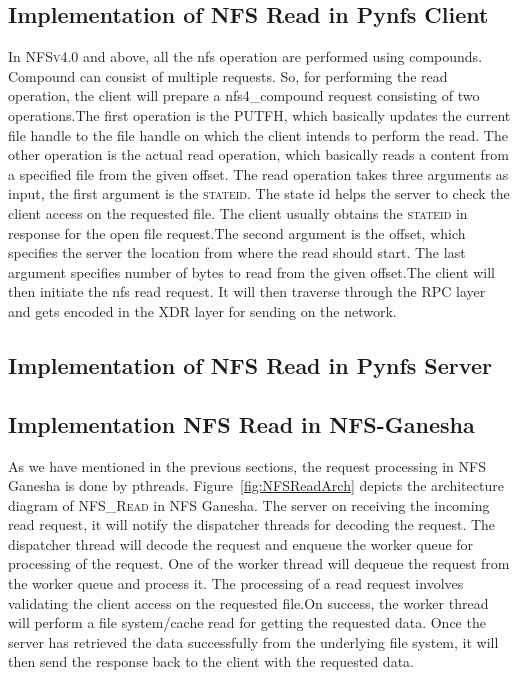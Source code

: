 \subsection{Implementation of NFS Read in Pynfs Client}
 
In \textsc{NFSv4.0} and above, all the nfs operation are performed using compounds. Compound can consist of multiple requests. So, for performing the read operation, the client will prepare a nfs4\_compound request consisting of two operations.The first operation is the \textsc{PUTFH}, which  basically updates the current file handle to the file handle on which the client intends to perform the read. The other operation is the actual read operation, which basically reads a content from a specified file from the given offset. The read operation takes three arguments as input, the first argument is the  \textsc{stateid}. The state id helps the server to check the client access on the requested file. The client usually obtains the \textsc{stateid} in response for the open file request.The second  argument is the offset, which specifies the server the location from where the read should start. The last argument specifies number of bytes to read from the given offset.The client will then initiate the nfs read request. It will then traverse through the RPC layer and gets encoded in the XDR layer for sending on the network.

\subsection{Implementation of NFS Read in Pynfs Server}


\subsection{Implementation NFS Read in NFS-Ganesha}

 As we have mentioned in the previous sections, the request processing in NFS Ganesha is done by pthreads. Figure~\ref{fig:NFSReadArch} depicts the architecture diagram of \textsc{NFS\_Read} in NFS Ganesha. The server on receiving the incoming read request, it will notify the dispatcher threads for decoding the request. The dispatcher thread will decode the request and enqueue the worker queue for processing of the request. One of the worker thread will dequeue the request from the worker queue and process it. The processing of a read request involves validating the client access on the requested file.On success, the worker thread will perform a file system/cache read for getting the requested data. Once the server has retrieved the data successfully from the underlying file system, it will then send the response back to the client with the requested data.
 
